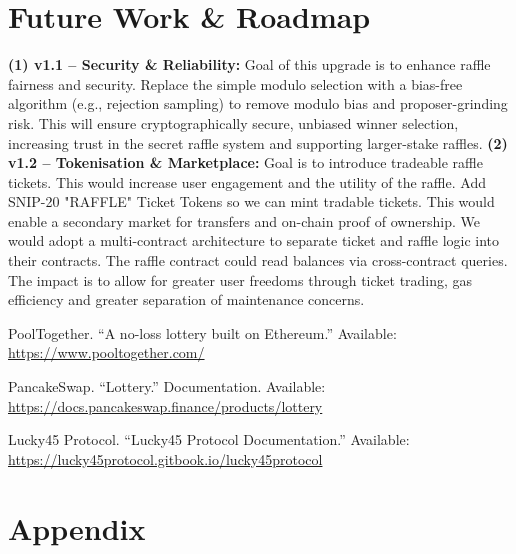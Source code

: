 \documentclass[8pt]{extarticle}
\begin{document}
\section{Future Work \& Roadmap}

\textbf{(1) v1.1 – Security \& Reliability:} Goal of this upgrade is to enhance raffle fairness and security. Replace the simple modulo selection with a bias-free algorithm (e.g., rejection sampling) to remove modulo bias and proposer-grinding risk. This will ensure cryptographically secure, unbiased winner selection, increasing trust in the secret raffle system and supporting larger-stake raffles. \textbf{(2) v1.2 – Tokenisation \& Marketplace:} Goal is to introduce tradeable raffle tickets. This would increase user engagement and the utility of the raffle. Add SNIP-20 "RAFFLE" Ticket Tokens so we can mint tradable tickets. This would enable a secondary market for transfers and on-chain proof of ownership. We would adopt a multi-contract architecture to separate ticket and raffle logic into their contracts. The raffle contract could read balances via cross-contract queries. The impact is to allow for greater user freedoms through ticket trading, gas efficiency and greater separation of maintenance concerns.

{\small
\begin{thebibliography}{9}

PoolTogether. ``A no-loss lottery built on Ethereum.'' Available: \url{https://www.pooltogether.com/}

PancakeSwap. ``Lottery.'' Documentation. Available: \url{https://docs.pancakeswap.finance/products/lottery}

Lucky45 Protocol. ``Lucky45 Protocol Documentation.'' Available: \url{https://lucky45protocol.gitbook.io/lucky45protocol}
\end{thebibliography}}

\section{Appendix}
\end{document}
